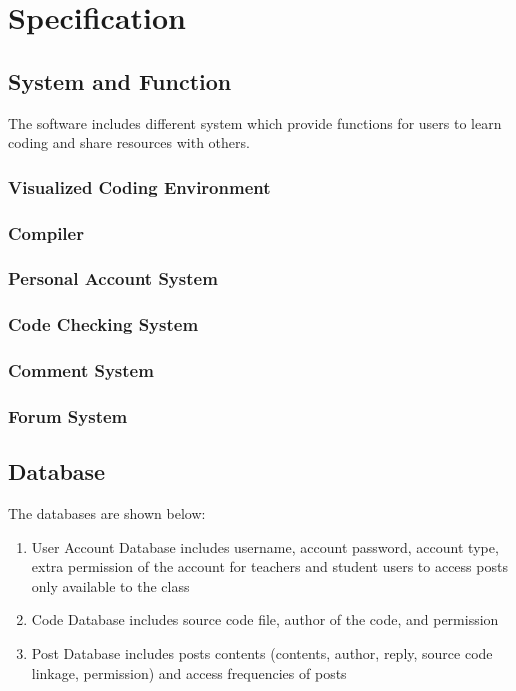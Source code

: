 \chapter{Specification}
\section{System and Function}
The software includes different system which provide functions for users to learn coding and share resources with others.
\subsection{Visualized Coding Environment}
	
\subsection{Compiler}
\subsection{Personal Account System}
	
\subsection{Code Checking System}
	
\subsection{Comment System}
	
\subsection{Forum System}
	
\section{Database}
The databases are shown below:
\begin{enumerate}
	\item User Account Database includes username, account password, account type, extra permission of the account for teachers and student users to access posts only available to the class
	\item Code Database includes source code file, author of the code, and permission
	\item Post Database includes posts contents (contents, author, reply, source code linkage, permission) and access frequencies of posts
\end{enumerate}
\newpage
